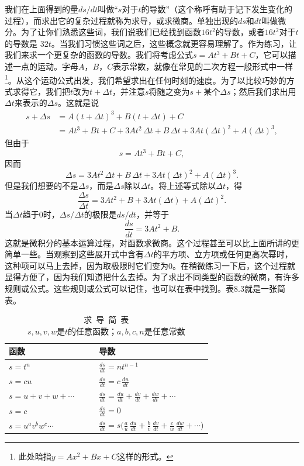 我们在上面得到的量$ds/dt$叫做“$s$对于$t$的导数”（这个称呼有助于记下发生变化的过程），而求出它的复杂过程就称为求导，或求微商。单独出现的$ds$和$dt$叫做微分。为了让你们熟悉这些词，我们说我们已经找到函数$16t^2$的导数，或者$16t^2$对于$t$的导数是 $32t$。当我们习惯这些词之后，这些概念就更容易理解了。作为练习，让我们来求一个更复杂的函数的导数。我们将考虑公式$s=At^3+Bt+C$，它可以描述一点的运动。字母$A$，$B$，$C$表示常数，就像在常见的二次方程一般形式中一样\footnote{此处暗指$y=Ax^2+Bx+C$这样的形式。}。从这个运动公式出发，我们希望求出在任何时刻的速度。为了以比较巧妙的方式求得它，我们把$t$改为$t+\Delta t$，并注意$s$将随之变为$s+\textrm{某个}\Delta s$；然后我们求出用$\Delta t$来表示的$\Delta s$。这就是说
\begin{align*}
s+\Delta s&=A(t+\Delta t)^3+B(t+\Delta t)+C\\[1ex]
&=At^3+Bt+C+3At^2\,\Delta t+B\,\Delta t+3At(\Delta t)^2+
A(\Delta t)^3,
\end{align*}
但由于
\begin{equation*}
s=At^3+Bt+C,
\end{equation*}
因而
\begin{equation*}
\Delta s=3At^2\,\Delta t+B\,\Delta t+3At(\Delta t)^2+A(\Delta t)^3.
\end{equation*}
但是我们想要的不是$\Delta s$，而是$\Delta s$除以$\Delta t$。将上述等式除以$\Delta t$，得
\begin{equation*}
\frac{\Delta s}{\Delta t}=3At^2+B+3At(\Delta t)+A(\Delta t)^2.
\end{equation*}
当$\Delta t$趋于0时，$\Delta s/\Delta t$的极限是$ds/dt$，并等于
\begin{equation*}
\frac{ds}{dt}=3At^2+B.
\end{equation*}
这就是微积分的基本运算过程，对函数求微商。这个过程甚至可以比上面所讲的更简单一些。当观察到这些展开式中含有$\Delta t$的平方项、立方项或任何更高次幂时，这种项可以马上去掉，因为取极限时它们变为0。在稍微练习一下后，这个过程就显得方便了，因为我们知道把什么去掉。为了求出不同类型的函数的微商，有许多规则或公式。这些规则或公式可以记住，也可以在表中找到。表8.3就是一张简表。
\begin{table}[H]
\renewcommand{\arraystretch}{1.5}
\centering
\label{tab:求导简表}
\caption{求~导~简~表 \\{\footnotesize $s, u, v, w$是$t$的任意函数；$a, b, c, n$是任意常数}}
\medskip 
\begin{tabular}{@{}ll@{}}
\toprule
函数 & 导数  \\ \midrule
$s=t^n$  & $\frac{ds}{dt}=nt^{n-1}$  \\
$s=cu$  & $\frac{ds}{dt}=c\,\frac{du}{dt}$ \\
$s=u+v+w+\dotsb\qquad $ & $ \frac{ds}{dt}=\frac{du}{dt}+\frac{dv}{dt}+\frac{dw}{dt}+\dotsb$  \\
$s=c$ & $\frac{ds}{dt}=0 $ \\
$s=u^av^bw^c\dotsm$ & $\frac{ds}{dt}=s\biggl(\frac{a}{u}\,\frac{du}{dt}+
\frac{b}{v}\,\frac{dv}{dt}+\frac{c}{w}\,\frac{dw}{dt}+\dotsb\biggr)$
 \\ \bottomrule
\end{tabular}
\end{table}




